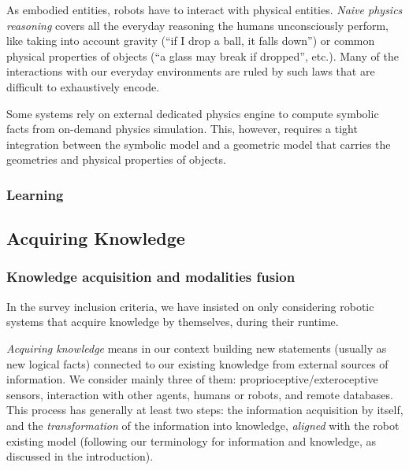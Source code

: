\documentclass[a4paper, twocolumn]{article}
\begin{document}
As embodied entities, robots have to interact with physical entities.
\emph{Naive physics reasoning} covers all the everyday reasoning the humans
unconsciously perform, like taking into account gravity (``if I drop a ball, it
falls down'') or common physical properties of objects (``a glass may break if
dropped'', etc.). Many of the interactions with our everyday environments are
ruled by such laws that are difficult to exhaustively encode.

Some systems \cite{Kunze2011a} rely on external dedicated physics engine to
compute symbolic facts from on-demand physics simulation. This, however,
requires a tight integration between the symbolic model and a geometric model
that carries the geometries and physical properties of objects.

\subsubsection{Learning}
\label{sect|learning}

\subsection{Acquiring Knowledge}

\begin{scriptsize}
\begin{center}
\end{center}
\end{scriptsize}

\subsubsection{Knowledge acquisition and modalities fusion}
\label{sect|knowledge-acquisition}

In the survey inclusion criteria, we have insisted on only considering robotic
systems that acquire knowledge by themselves, during their runtime.

\emph{Acquiring knowledge} means in our context building new statements
(usually as new logical facts) connected to our existing knowledge from
external sources of information. We consider mainly three of them:
proprioceptive/exteroceptive sensors, interaction with other agents, humans or
robots, and remote databases. This process has generally at least two steps:
the information acquisition by itself, and the \emph{transformation} of the
information into knowledge, \emph{aligned} with the robot existing model
(following our terminology for information and knowledge, as discussed in the
introduction).
\end{document}
